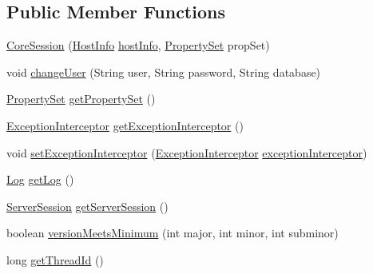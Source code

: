 \subsection*{Public Member Functions}
\begin{DoxyCompactItemize}
\item 
\mbox{\hyperlink{classcom_1_1mysql_1_1cj_1_1_core_session_a3f839aecfd1bdcd957ddf4a6a653e7ba}{Core\+Session}} (\mbox{\hyperlink{classcom_1_1mysql_1_1cj_1_1conf_1_1_host_info}{Host\+Info}} \mbox{\hyperlink{classcom_1_1mysql_1_1cj_1_1_core_session_ac60f96087dc4f9a719f136f8fb74fddf}{host\+Info}}, \mbox{\hyperlink{interfacecom_1_1mysql_1_1cj_1_1conf_1_1_property_set}{Property\+Set}} prop\+Set)
\item 
void \mbox{\hyperlink{classcom_1_1mysql_1_1cj_1_1_core_session_afd7da447c9a92c0a51ba81a6ac82e89f}{change\+User}} (String user, String password, String database)
\item 
\mbox{\hyperlink{interfacecom_1_1mysql_1_1cj_1_1conf_1_1_property_set}{Property\+Set}} \mbox{\hyperlink{classcom_1_1mysql_1_1cj_1_1_core_session_a1b6c6041a2c657d34bb369939f6b49d2}{get\+Property\+Set}} ()
\item 
\mbox{\hyperlink{interfacecom_1_1mysql_1_1cj_1_1exceptions_1_1_exception_interceptor}{Exception\+Interceptor}} \mbox{\hyperlink{classcom_1_1mysql_1_1cj_1_1_core_session_a8718a19455dcfc23e1f3e36d3278d7bd}{get\+Exception\+Interceptor}} ()
\item 
void \mbox{\hyperlink{classcom_1_1mysql_1_1cj_1_1_core_session_ab034a178b27542d0d67bbb95283d3f03}{set\+Exception\+Interceptor}} (\mbox{\hyperlink{interfacecom_1_1mysql_1_1cj_1_1exceptions_1_1_exception_interceptor}{Exception\+Interceptor}} \mbox{\hyperlink{classcom_1_1mysql_1_1cj_1_1_core_session_a60aecfa7655db14a1c4d4c2e7bbfab64}{exception\+Interceptor}})
\item 
\mbox{\hyperlink{interfacecom_1_1mysql_1_1cj_1_1log_1_1_log}{Log}} \mbox{\hyperlink{classcom_1_1mysql_1_1cj_1_1_core_session_ae6ee08b5d613e57d0f9e16f037ecb6cf}{get\+Log}} ()
\item 
\mbox{\hyperlink{interfacecom_1_1mysql_1_1cj_1_1protocol_1_1_server_session}{Server\+Session}} \mbox{\hyperlink{classcom_1_1mysql_1_1cj_1_1_core_session_aebba972c5e1c2f61230c8be4b2819230}{get\+Server\+Session}} ()
\item 
boolean \mbox{\hyperlink{classcom_1_1mysql_1_1cj_1_1_core_session_ac8cdb7493dd85ef25abc436061e704eb}{version\+Meets\+Minimum}} (int major, int minor, int subminor)
\item 
long \mbox{\hyperlink{classcom_1_1mysql_1_1cj_1_1_core_session_ae141e5eacf82d93db417cb2e97acfece}{get\+Thread\+Id}} ()

\end{DoxyCompactItemize}
